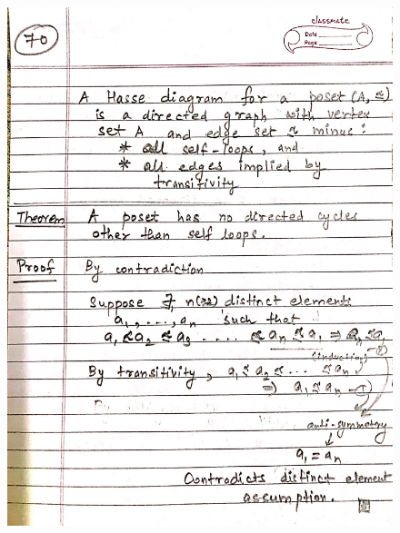 \begin{figure}[H]
    \centering
    \includegraphics[scale=0.25]{"./MIT 6.042J/MIT_6042J_070"}
\end{figure}
\newpage
